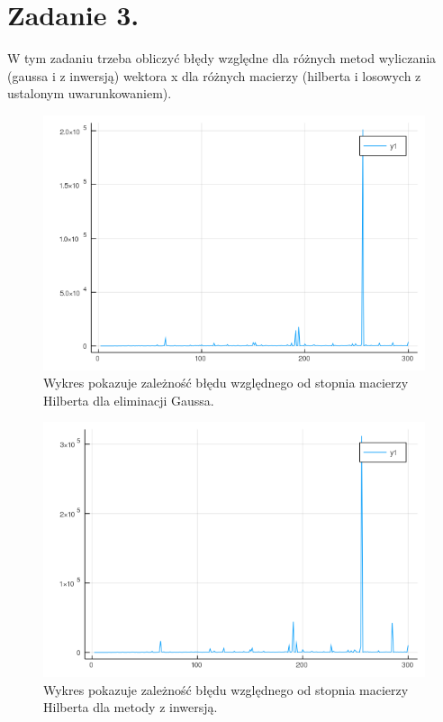 \documentclass{article}
\begin{document}
\section{Zadanie 3.}
W tym zadaniu trzeba obliczyć błędy względne dla różnych metod wyliczania (gaussa i z inwersją) wektora x dla różnych macierzy (hilberta i losowych z ustalonym uwarunkowaniem).
\begin{figure}[H]
	\includegraphics[width=\linewidth]{hilbert_gauss.png}
	\caption{Wykres pokazuje zależność błędu względnego od stopnia macierzy Hilberta dla eliminacji Gaussa.}
	\label{fig:hilbert-gauss}
\end{figure}
\begin{figure}[H]
	\includegraphics[width=\linewidth]{hilbert_inwersja.png}
	\caption{Wykres pokazuje zależność błędu względnego od stopnia macierzy Hilberta dla metody z inwersją.}
	\label{fig:hilbert-inv}
\end{figure}
\end{document}
